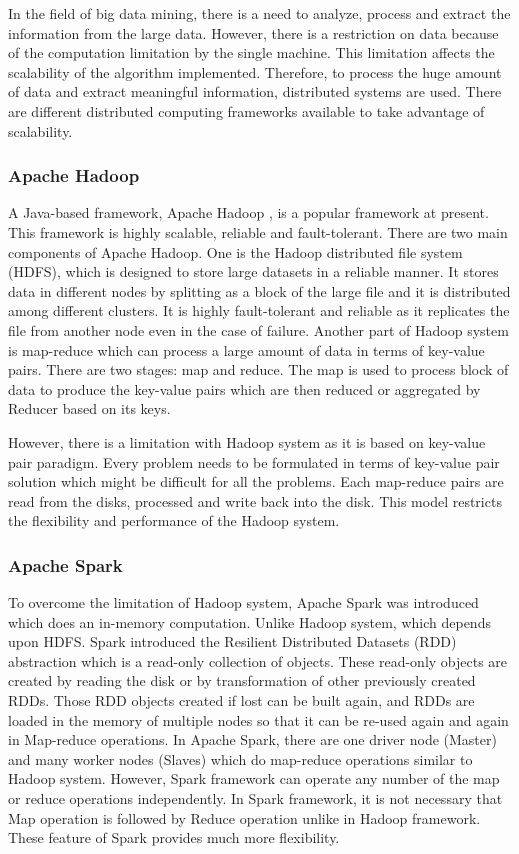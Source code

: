 \documentclass[11pt,openright]{report}
\begin{document}
In the field of big data mining, there is a need to analyze, process and extract the information from the large data. However, there is a restriction on data because of the computation limitation by the single machine. This limitation affects the scalability of the algorithm implemented. Therefore, to process the huge amount of data and extract meaningful information, distributed systems are used. There are different distributed computing frameworks available to take advantage of scalability. 


\subsubsection{Apache Hadoop}
A Java-based framework, Apache Hadoop \cite{ApacheHadoop}, is a popular framework at present. This framework is highly scalable, reliable and fault-tolerant. There are two main components of Apache Hadoop. One is the Hadoop distributed file system (HDFS), which is designed to store large datasets in a reliable manner. It stores data in different nodes by splitting as a block of the large file and it is distributed among different clusters. It is highly fault-tolerant and reliable as it replicates the file from another node even in the case of failure. Another part of Hadoop system is map-reduce which can process a large amount of data in terms of key-value pairs. There are two stages: map and reduce. The map is used to process block of data to produce the key-value pairs which are then reduced or aggregated by Reducer based on its keys.

However, there is a limitation with Hadoop system as it is based on key-value pair paradigm. Every problem needs to be formulated in terms of key-value pair solution which might be difficult for all the problems. Each map-reduce pairs are read from the disks, processed and write back into the disk. This model restricts the flexibility and performance of the Hadoop system.

\subsubsection{Apache Spark}
To overcome the limitation of Hadoop system, Apache Spark \cite{Zaharia2010} was introduced which does an in-memory computation. Unlike Hadoop system, which depends upon HDFS. Spark introduced the Resilient Distributed Datasets (RDD) abstraction which is a read-only collection of objects. These read-only objects are created by reading the disk or by transformation of other previously created RDDs. Those RDD objects created if lost can be built again, and RDDs are loaded in the memory of multiple nodes so that it can be re-used again and again in Map-reduce operations. In Apache Spark, there are one driver node (Master) and many worker nodes (Slaves) which do map-reduce operations similar to Hadoop system. However, Spark framework can operate any number of the map or reduce operations independently. In Spark framework, it is not necessary that Map operation is followed by Reduce operation unlike in Hadoop framework. These feature of Spark provides much more flexibility.
\end{document}
